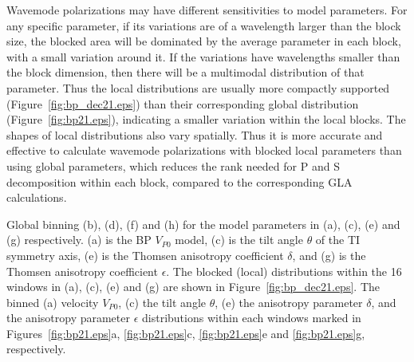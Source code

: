 \documentclass[manuscript,ulem,graphix,revised]{geophysics}
\begin{document}
Wavemode polarizations may have different sensitivities to model parameters. For any specific parameter, if its variations are of a wavelength larger than the block size, the blocked area will be dominated by the average parameter in each block, with a small variation around it. If the variations have wavelengths 
smaller than the block dimension, then there will be a multimodal distribution of that parameter.
Thus the local distributions are usually more compactly supported (Figure~\ref{fig:bp_dec21.eps}) than their corresponding global distribution (Figure~\ref{fig:bp21.eps}), indicating a smaller variation within the local blocks. The shapes of local distributions also vary spatially. 
Thus it is more accurate and effective to calculate wavemode polarizations with blocked local parameters than using global parameters, which reduces the rank needed for P and S decomposition  within each block, compared to the corresponding GLA calculations.



 {
 \small{
Global binning (b), (d), (f) and (h) for the model parameters in (a), (c), (e) and (g) respectively.
 (a) is the BP $V_{P0}$ model, (c) is the tilt angle $\theta$ of the TI symmetry axis, (e) is the Thomsen anisotropy coefficient $\delta$, and (g) is the Thomsen anisotropy coefficient $\epsilon$. The blocked (local) distributions within the 16 windows in (a), (c), (e) and (g) are shown in Figure~\ref{fig:bp_dec21.eps}.
}
}
 {
 The binned (a) velocity $V_{P0}$, (c) the tilt angle $\theta$, (e) the anisotropy parameter $\delta$, and the anisotropy parameter $\epsilon$ distributions within each windows marked in Figures~\ref{fig:bp21.eps}a, \ref{fig:bp21.eps}c, \ref{fig:bp21.eps}e and \ref{fig:bp21.eps}g, respectively.
}
\end{document}
